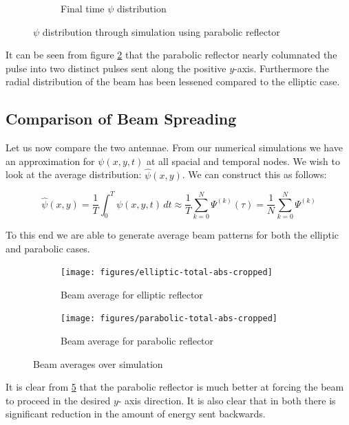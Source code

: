 \documentclass{article}
\begin{document}
\begin{figure}[h]
\begin{subfigure}[b]{0.45\textwidth}
    \caption{Final time $\psi$ distribution}
    \label{fig:para-end}
  \end{subfigure}
  \caption{$\psi$ distribution through simulation using parabolic reflector}
  \label{fig:para-distribution}
\end{figure}

It can be seen from figure \ref{fig:para-distribution} that
the parabolic reflector nearly columnated the pulse into two distinct pulses
sent along the positive $y$-axis.  Furthermore the radial distribution of the
beam has been lessened compared to the elliptic case.


\subsection{Comparison of Beam Spreading}

Let us now compare the two antennae.  From our numerical simulations we
have an approximation for $\psi(x,y,t)$ at all spacial and temporal nodes.
We wish to look at the average distribution: $\hat{\psi}(x,y)$.  We can
construct this as follows:

\begin{equation}
  \label{eq:build-psi-avg}
  \hat{\psi}(x,y) = \frac{1}{T} \int_0^T \psi(x,y,t) \, dt \approx
  \frac{1}{T} \sum_{k=0}^N \Psi^{(k)} (\tau) = \frac{1}{N}
  \sum_{k=0}^N \Psi^{(k)}
\end{equation}

To this end we are able to generate average beam patterns for both the
elliptic and parabolic cases.

\begin{figure}[h]
  \begin{subfigure}[b]{0.49\textwidth}
    \texttt{[image: figures/elliptic-total-abs-cropped]}
    \caption{Beam average for elliptic reflector}
    \label{fig:avg-elliptic}
  \end{subfigure}
  \begin{subfigure}[b]{0.49\textwidth}
    \texttt{[image: figures/parabolic-total-abs-cropped]}
    \caption{Beam average for parabolic reflector}
    \label{fig:avg-parabolic}
  \end{subfigure}
  \caption{Beam averages over simulation}
  \label{fig:avg-beam-patterns}
\end{figure}

It is clear from \ref{fig:avg-beam-patterns} that the parabolic reflector is
much better at forcing the beam to proceed in the desired $y$- axis direction.
It is also clear that in both there is significant reduction in the amount
of energy sent backwards.
\end{document}
